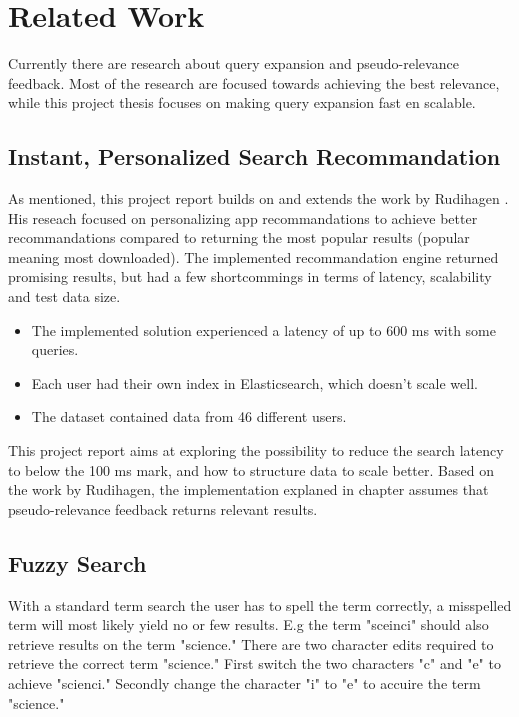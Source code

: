 \chapter{Related Work}
\label{ch:related-work}
Currently there are research about query expansion and pseudo-relevance feedback.
Most of the research are focused towards achieving the best relevance,
while this project thesis focuses on making query expansion fast en scalable.

\section{Instant, Personalized Search Recommandation}
As mentioned, this project report builds on and extends the work by Rudihagen \cite{master-thesis}.
His reseach focused on personalizing app recommandations to achieve better recommandations compared to returning the most popular results (popular meaning most downloaded).
The implemented recommandation engine returned promising results, but had a few shortcommings in terms of latency, scalability and test data size.

\begin{itemize}
  \item The implemented solution experienced a latency of up to 600 ms with some queries.
  \item Each user had their own index in Elasticsearch, which doesn't scale well.
  \item The dataset contained data from 46 different users.
\end{itemize}

This project report aims at exploring the possibility to reduce the search latency to below the 100 ms mark, and how to structure data to scale better.
Based on the work by Rudihagen,
the implementation explaned in chapter \cite{ch:approach} assumes that pseudo-relevance feedback returns relevant results.

\section{Fuzzy Search}
With a standard term search the user has to spell the term correctly, a misspelled term will most likely yield no or few results.
E.g the term "sceinci" should also retrieve results on the term "science."
There are two character edits required to retrieve the correct term "science."
First switch the two characters "c" and "e" to achieve "scienci."
Secondly change the character "i" to "e" to accuire the term "science."

